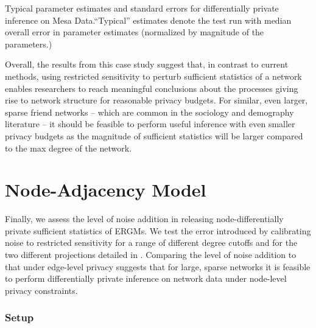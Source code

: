 		\begin{table}[!h]
		\caption{Typical parameter estimates and standard errors for differentially private inference on Mesa Data.``Typical'' estimates denote the test run with median overall error in parameter estimates (normalized by magnitude of the parameters.)} 
		\label{tab:infalttyp}
		\centering
		
	\end{table}

	Overall, the results from this case study suggest that, in contrast to current methods, using restricted sensitivity to perturb sufficient statistics of a network enables researchers to reach meaningful conclusions about the processes giving rise to network structure for reasonable privacy budgets. For similar, even larger, sparse friend networks -- which are common in the sociology and demography literature --  it should be feasible to perform useful inference with even smaller privacy budgets as the magnitude of sufficient statistics will be larger compared to the max degree of the network. 
 
 \section{Node-Adjacency Model}
 
   Finally, we assess the level of noise addition in releasing node-differentially private sufficient statistics of ERGMs. We test the error introduced by calibrating noise to restricted sensitivity for a range of different degree cutoffs and for the two different projections detailed in . Comparing the level of noise addition to that under edge-level privacy suggests that for large, sparse networks it is feasible to perform differentially private inference on network data under node-level privacy constraints.
 
 \subsubsection*{Setup}

